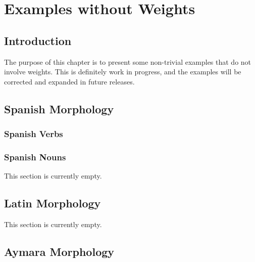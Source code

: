 \chapter{Examples without Weights}

\label{chapt:exampleswithoutweights}

\section{Introduction}

The purpose of this chapter is to present some non-trivial examples that
do not involve weights.  This is definitely work in progress, and the
	examples will be corrected and expanded in future releases.

\section{Spanish Morphology}

\subsection{Spanish Verbs}

\subsection{Spanish Nouns}

This section is currently empty.

\section{Latin Morphology}

This section is currently empty.

\section{Aymara Morphology}


